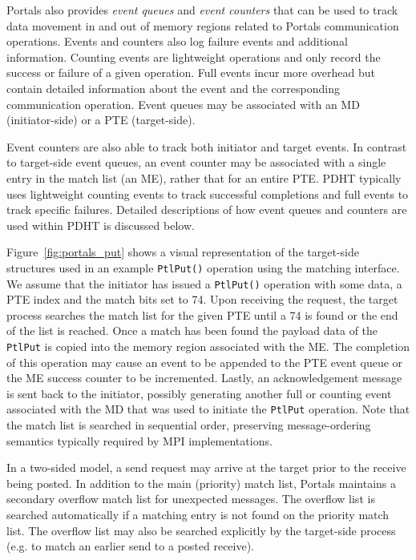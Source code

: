 Portals also provides {\em event queues} and {\em event counters} that can be
used to track data movement in and out of memory regions related to Portals
communication operations. Events and counters also log failure events and
additional information. Counting events are lightweight operations and only
record the success or failure of a given operation. Full events incur more
overhead but contain detailed information about the event and the corresponding
communication operation. Event queues may be associated with an MD
(initiator-side) or a PTE (target-side). 

Event counters are also able to track both initiator and target events. In
contrast to target-side event queues, an event counter may be associated with a
single entry in the match list (an ME), rather that for an entire PTE. PDHT
typically uses lightweight counting events to track successful completions and
full events to track specific failures. Detailed descriptions of how event
queues and counters are used within PDHT is discussed below.

Figure~\ref{fig:portals_put} shows a visual representation of the target-side
structures used in an example {\tt PtlPut()} operation using the matching
interface. We assume that the initiator has issued a {\tt PtlPut()} operation
with some data, a PTE index and the match bits set to 74. Upon receiving the
request, the target process searches the match list for the given PTE until a
74 is found or the end of the list is reached. Once a match has been found the
payload data of the {\tt PtlPut} is copied into the memory region associated
with the ME. The completion of this operation may cause an event to be appended
to the PTE event queue or the ME success counter to be incremented. 
Lastly, an acknowledgement message is sent back to the initiator, possibly
generating another full or counting event associated with the MD that
was used to initiate the {\tt PtlPut} operation. Note that the match list is 
searched in sequential order, preserving message-ordering semantics
typically required by MPI implementations.

In a two-sided model, a send request may arrive at the target prior to the
receive being posted. In addition to the main (priority) match list, Portals
maintains a secondary overflow match list for unexpected messages.  The
overflow list is searched automatically if a matching entry is not found on the
priority match list. The overflow list may also be searched explicitly by
the target-side process (e.g. to match an earlier send to a posted receive).


